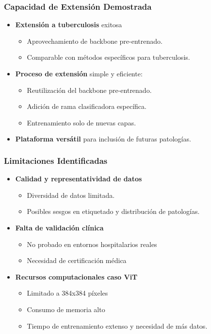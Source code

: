 \begin{frame}
\frametitle{Capacidad de Extensión Demostrada}
\begin{itemize}
    \item \textbf{Extensión a tuberculosis} exitosa
    \begin{itemize}
        \item Aprovechamiento de backbone pre-entrenado.
        \item Comparable con métodos específicos para tuberculosis.
    \end{itemize}
    \item \textbf{Proceso de extensión} simple y eficiente:
    \begin{itemize}
        \item Reutilización del backbone pre-entrenado.
        \item Adición de rama clasificadora específica.
        \item Entrenamiento solo de nuevas capas.
    \end{itemize}
    \item \textbf{Plataforma versátil} para inclusión de futuras patologías.
\end{itemize}
\end{frame}


\begin{frame}
\frametitle{Limitaciones Identificadas}
\begin{itemize}
    \item \textbf{Calidad y representatividad de datos}
    \begin{itemize}
        \item Diversidad de datos limitada.
        \item Posibles sesgos en etiquetado y distribución de patologías.
    \end{itemize}
    \item \textbf{Falta de validación clínica}
    \begin{itemize}
        \item No probado en entornos hospitalarios reales
        \item Necesidad de certificación médica
    \end{itemize}
    \item \textbf{Recursos computacionales caso ViT}
    \begin{itemize}
        \item Limitado a 384x384 píxeles
        \item Consumo de memoria alto
        \item Tiempo de entrenamiento extenso y necesidad de más datos.
    \end{itemize}
\end{itemize}
\end{frame}

